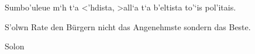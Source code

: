 
\hsize 4in
\agr Sumbo'uleue m`h t`a <'hdista, >all`a t`a b'eltista to'`is pol'itais.
\par\hfill S'olwn
\medskip
\rm Rate den B\"urgern nicht das Angenehmste sondern das Beste.
\par\hfill Solon
\bye
